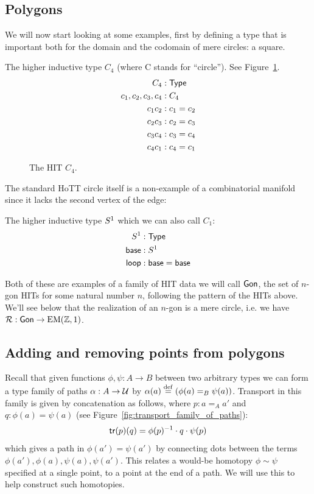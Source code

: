 \subsection{Polygons}\label{sec:polygons}

We will now start looking at some examples, first by defining a type that is important both for the domain and the codomain of mere circles: a square.

\begin{mydef}
The higher inductive type \( C_4 \) (where C stands for ``circle''). See Figure~\ref{fig:c4}.
\begin{align*}
C_4 &: \mathsf{Type} \\
c_1, c_2, c_3, c_4 &: C_4 \\
c_1c_2 &: c_1 = c_2 \\
c_2c_3 &: c_2 = c_3 \\
c_3c_4 &: c_3 = c_4 \\
c_4c_1 &: c_4 = c_1 \\
\end{align*}
\end{mydef}

\begin{figure}[htbp]
\centering

\caption{The HIT \( C_4 \).}
\label{fig:c4}
\end{figure}

The standard HoTT circle itself is a non-example of a combinatorial manifold since it lacks the second vertex of the edge:

\begin{mydef}
The higher inductive type \( S^1 \) which we can also call \( C_1 \):
\begin{align*}
S^1 &:\mathsf{Type} \\
\mathsf{base}&:S^1 \\
\mathsf{loop}&:\mathsf{base}=\mathsf{base}
\end{align*}
\end{mydef}

Both of these are examples of a family of HIT data we will call \( \mathsf{Gon} \), the set of \( n \)-gon HITs for some natural number \( n \), following the pattern of the HITs above. We'll see below that the realization of an \( n \)-gon is a mere circle, i.e. we have \( \mathcal{R}:\mathsf{Gon}\to \mathrm{EM}(\mathbb{Z},1) \).

\subsection{Adding and removing points from polygons}
Recall that given functions \( \phi,\psi:A\to B \) between two arbitrary types we can form a type family of paths \( \alpha:A\to\mathcal{U} \) by \( \alpha(a)\stackrel{\mathrm{def}}{=}(\phi(a)=_B\psi(a)) \). Transport in this family is given by concatenation as follows, where \( p:a=_A a' \) and \( q:\phi(a)=\psi(a) \) (see Figure~\ref{fig:transport_family_of_paths}):
\[ 
\mathsf{tr}(p)(q) = \phi(p)^{-1}\cdot q\cdot \psi(p)
\]
which gives a path in \( \phi(a')=\psi(a') \) by connecting dots between the terms \( \phi(a'), \phi(a), \psi(a), \psi(a') \). This relates a would-be homotopy \( \phi\sim\psi \) specified at a single point, to a point at the end of a path. We will use this to help construct such homotopies.

